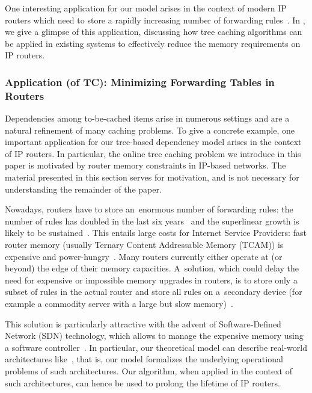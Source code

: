 One interesting application for our model arises in the context of modern IP
routers which need to store a rapidly increasing number of forwarding
rules~\cite{bgp-routeviews,steve-myth}. In , we
give a glimpse of this application, discussing how tree caching algorithms can
be applied in existing systems to effectively reduce the memory requirements
on IP routers.

\subsubsection{Application (of TC): Minimizing Forwarding Tables in Routers}
\label{sec:motivation}

Dependencies among to-be-cached items arise in numerous settings and are a
natural refinement of many caching problems. To give a concrete example, one
important application for our tree-based dependency model arises in the context
of IP routers. In particular, the online tree caching problem we introduce in
this paper is motivated by router memory constraints in IP-based networks. The
material presented in this section serves for motivation, and is not necessary
for understanding the remainder of the paper.

Nowadays, routers have to store an~enormous number of forwarding rules: the
number of rules has doubled in the last six years~\cite{bgp-routeviews} and
the superlinear growth is likely to be sustained~\cite{steve-myth}. This
entails large costs for Internet Service Providers: fast router memory
(usually Ternary Content Addressable Memory (TCAM)) is expensive and
power-hungry~\cite{tcam-expensive}.  Many routers currently either operate at
(or beyond) the edge of their memory capacities. A~solution, which could delay
the need for expensive or impossible memory upgrades in routers, is to store
only a subset of rules in the actual router and store all rules on a~secondary
device (for example a commodity server with a large but slow
memory)~\cite{cacheflow,route-caching-flat,prefix-caching,fib-caching-non-overlapping,fibium-zipf}.

This solution is particularly attractive with the advent of Soft\-ware-Defined
Network (SDN) technology, which allows to manage the expensive memory using a
software controller~\cite{cacheflow,fibium-zipf}. In particular, our
theoretical model can describe real-world architectures
like~\cite{cacheflow,fibium-zipf},
that is, our model formalizes the underlying operational
problems of such architectures. Our 
algorithm, when applied in the context of such architectures, can 
hence be used to prolong the lifetime of IP routers.

